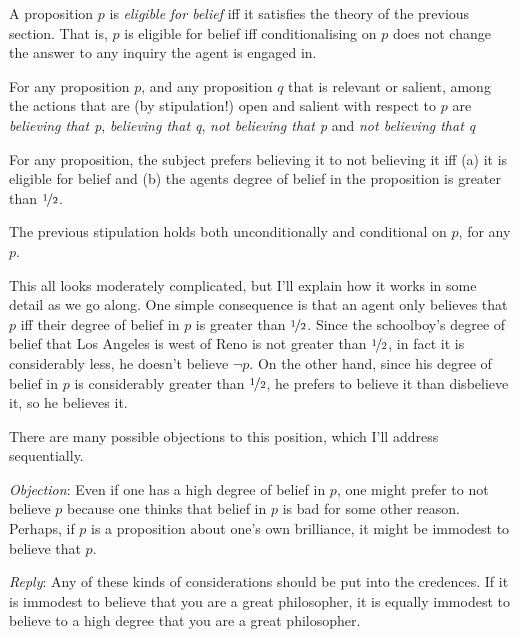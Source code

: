 \begin{itemize*}
\item A proposition \(p\) is \textit{eligible} \textit{for belief} iff it satisfies the theory of the previous section. That is, \(p\) is eligible for belief iff conditionalising on \(p\) does not change the answer to any inquiry the agent is engaged in.
\item For any proposition \(p\), and any proposition \(q\) that is relevant or salient, among the actions that are (by stipulation!) open and salient with respect to \(p\) are \textit{believing that p}, \textit{believing that q}, \textit{not believing that p} and \textit{not believing that q}
\item For any proposition, the subject prefers believing it to not believing it iff (a) it is eligible for belief and (b) the agents degree of belief in the proposition is greater than \(\nicefrac{1}{2}\). 
\item The previous stipulation holds both unconditionally and conditional on \(p\), for any \(p\).
\end{itemize*}

\noindent This all looks moderately complicated, but I'll explain how it works in some detail as we go along. One simple consequence is that an agent only believes that \(p\) iff their degree of belief in \(p\) is greater than \(\nicefrac{1}{2}\). Since the schoolboy's degree of belief that Los Angeles is west of Reno is not greater than \(\nicefrac{1}{2}\), in fact it is considerably less, he doesn't believe \(\neg p\). On the other hand, since his degree of belief in \(p\) is considerably greater than \(\nicefrac{1}{2}\), he prefers to believe it than disbelieve it, so he believes it.

There are many possible objections to this position, which I'll address sequentially.

\medskip

\noindent \textit{Objection}: Even if one has a high degree of belief in \(p\), one might prefer to not believe \(p\) because one thinks that belief in \(p\) is bad for some other reason. Perhaps, if \(p\) is a proposition about one's own brilliance, it might be immodest to believe that \(p\).

\noindent \textit{Reply}: Any of these kinds of considerations should be put into the credences. If it is immodest to believe that you are a great philosopher, it is equally immodest to believe to a high degree that you are a great philosopher.

